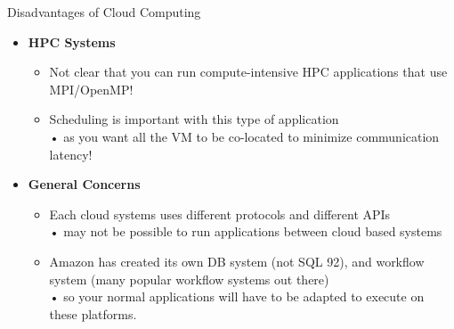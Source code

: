 \documentclass{SKP-beamer}
\begin{document}
\begin{frame}{Disadvantages of Cloud Computing}
	\begin{itemize}
		
		\item  \textbf{HPC Systems}
		\begin{itemize}
		\item  Not clear that you can run compute-intensive HPC applications that use MPI/OpenMP!
		\item  Scheduling is important with this type of application \\
		• as you want all the VM to be co-located to minimize communication latency!
			
		\end{itemize}
		\item  \textbf{General Concerns}
		\begin{itemize}
		\item  Each cloud systems uses different protocols and different APIs \\
		• may not be possible to run applications between cloud based systems
		\item  Amazon has created its own DB system (not SQL 92), and workflow system (many 
		popular workflow systems out there)\\
		• so your normal applications will have to be adapted to execute on these platforms.
			
			
		\end{itemize}
	\end{itemize}
\end{frame}

\end{document}
